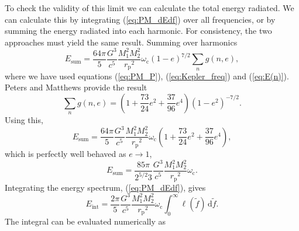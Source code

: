 \documentclass[aps,prd,reprint,showpacs,groupedaddress]{revtex4-1}
\newcommand{\eqnref}[1]{(\ref{eq:#1})}
\newcommand{\sub}[1]{\ensuremath{_\text{#1}}}
\newcommand{\dd}{\ensuremath{\mathrm{d}}}
\newcommand{\intd}[4]{\ensuremath{\int_{#1}^{#2}{#3}\,\dd{#4}}}
\begin{document}
To check the validity of this limit we can calculate the total energy radiated. We can calculate this by integrating \eqnref{PM_dEdf} over all frequencies, or by summing the energy radiated into each harmonic. For consistency, the two approaches must yield the same result. Summing over harmonics
\begin{equation}
E\sub{sum} = \frac{64\pi}{5}\frac{G^3}{c^5}\frac{M_1^2M_2^2}{r\sub{p}^2}\omega\sub{c}(1-e)^{7/2}\sum_n g(n,e),
\end{equation}
where we have used equations \eqnref{PM_P}, \eqnref{Kepler_freq} and \eqnref{E(n)}. Peters and Matthews\cite{Peters1963} provide the result
\begin{equation}
\sum_n g(n,e) = \left(1 + \frac{73}{24}e^2 + \frac{37}{96}e^4\right)(1-e^2)^{-7/2}.
\end{equation}
Using this,
\begin{equation}
E\sub{sum} = \frac{64\pi}{5}\frac{G^3}{c^5}\frac{M_1^2M_2^2}{r\sub{p}^2}\omega\sub{c}\left(1 + \frac{73}{24}e^2 + \frac{37}{96}e^4\right),
\end{equation}
which is perfectly well behaved as $e \rightarrow 1$,
\begin{equation}
E\sub{sum} = \frac{85\pi}{2^{5/2}3}\frac{G^3}{c^5}\frac{M_1^2M_2^2}{r\sub{p}^2}\omega\sub{c}.
\label{eq:PM_total}
\end{equation}
Integrating the energy spectrum, \eqnref{PM_dEdf}, gives
\begin{equation}
E\sub{int} = \frac{2\pi}{5}\frac{G^3}{c^5}\frac{M_1^2M_2^2}{r\sub{p}^2}\omega\sub{c}\intd{0}{\infty}{\ell(\tilde{f})}{\tilde{f}}.
\end{equation}
The integral can be evaluated numerically as
\end{document}

